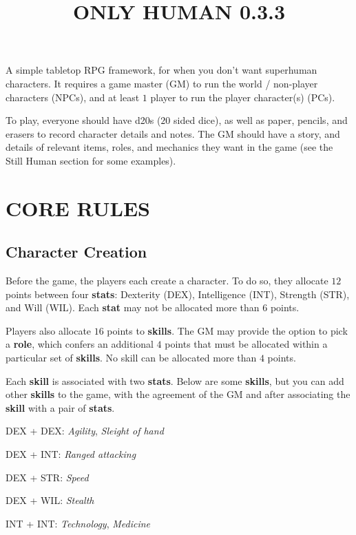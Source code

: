 \documentclass[11pt]{article}
\title{\vspace{-4ex}ONLY HUMAN 0.3.3\vspace{-6.5ex}}
\date{}
\begin{document}
\begin{multicols}{3}
  \maketitle

  A simple tabletop RPG framework, for when you don't want superhuman
  characters. It requires a game master (GM) to run the world / non-player
  characters (NPCs), and at least $1$ player to run the player character(s)
  (PCs).

  To play, everyone should have d20s ($20$ sided dice), as well as paper,
  pencils, and erasers to record character details and notes. The GM should have
  a story, and details of relevant items, roles, and mechanics they want in the
  game (see the Still Human section for some examples).
  \section*{CORE RULES}

  \subsection*{Character Creation}

  Before the game, the players each create a character. To do so, they allocate
  $12$ points between four \textbf{stats}: Dexterity (DEX), Intelligence (INT),
  Strength (STR), and Will (WIL). Each \textbf{stat} may not be allocated more
  than $6$ points.

  Players also allocate $16$ points to \textbf{skills}. The GM may provide the
  option to pick a \textbf{role}, which confers an additional $4$ points that
  must be allocated within a particular set of \textbf{skills}. No skill can be
  allocated more than $4$ points.

  Each \textbf{skill} is associated with two \textbf{stats}. Below are some
  \textbf{skills}, but you can add other \textbf{skills} to the game, with the
  agreement of the GM and after associating the \textbf{skill} with a pair of
  \textbf{stats}.

  \begin{multicols}{2}
    DEX + DEX: ​\textit{Agility​},​ \textit{Sleight of hand}

    DEX + INT: \textit{​Ranged attacking​}

    DEX + STR: ​\textit{Speed}

    DEX + WIL: ​\textit{Stealth}

    INT + INT: ​\textit{Technology​},​ \textit{Medicine}


\end{multicols}
\end{multicols}
\end{document}
